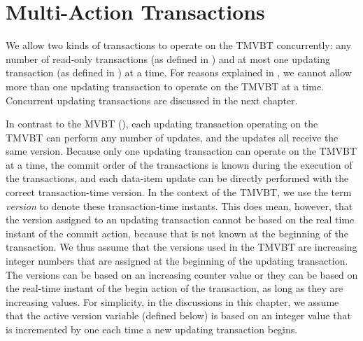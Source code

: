 \section{Multi-Action Transactions}
\label{sec:tmvbt:multi-action-tx}

We allow two kinds of transactions to operate on the TMVBT concurrently: 
any number of read-only transactions (as defined in
) and at most one updating transaction (as
defined in ) at a time. 
For reasons explained in , we cannot allow more
than one updating transaction to operate on the TMVBT at a time.
Concurrent updating transactions are discussed in the next chapter.

In contrast to the MVBT (), each updating
transaction operating on the TMVBT can perform any number of updates, and the
updates all receive the same version.
Because only one updating transaction can operate on the TMVBT at a time, the
commit order of the transactions is known during the execution of the
transactions, and each data-item update can be directly performed with the
correct transaction-time version.
In the context of the TMVBT, we use the term \emph{version} to denote these
transaction-time instants. 
This does mean, however, that the version assigned to an updating
transaction cannot be based on the real time instant of the commit action,
because that is not known at the beginning of the transaction.
We thus assume that the versions used in the TMVBT are increasing
integer numbers that are assigned at the beginning of the updating
transaction.
The versions can be based on an increasing counter value or they can be based
on the real-time instant of the begin action of the transaction, as long as
they are increasing values.
For simplicity, in the discussions in this chapter, we assume that the
active version variable (defined below) is based on an integer value that is
incremented by one each time a new updating transaction begins.

